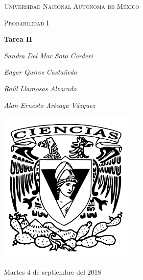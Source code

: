 \documentclass[12pt,a4paper]{report}
\begin{document}
\begin{titlepage}
	\centering
	{\scshape\LARGE Universidad Nacional Autónoma de México \par}
	\vspace{1cm}
	{\scshape\Large Probabilidad I\par}
	\vspace{1.5cm}
	{\huge\bfseries Tarea II\par}
	\vspace{.5cm}
	{\Large\itshape Sandra Del Mar Soto Corderi \par}
	\vspace{.5cm}
	{\Large\itshape Edgar Quiroz Castañeda \par}
    \vspace{.5cm}
	{\Large\itshape Raúl Llamosas Alvarado \par}
	 \vspace{.5cm}
	{\Large\itshape Alan Ernesto Arteaga Vázquez \par}
	\vfill
	 \includegraphics[width=0.5\textwidth]{escudo.png}
	\vfill

	{\large Martes 4 de septiembre del 2018 \par}
\end{titlepage}

\pagebreak
\setlength{\voffset}{-0.75in}
\setlength{\headsep}{5pt}
\end{document}
